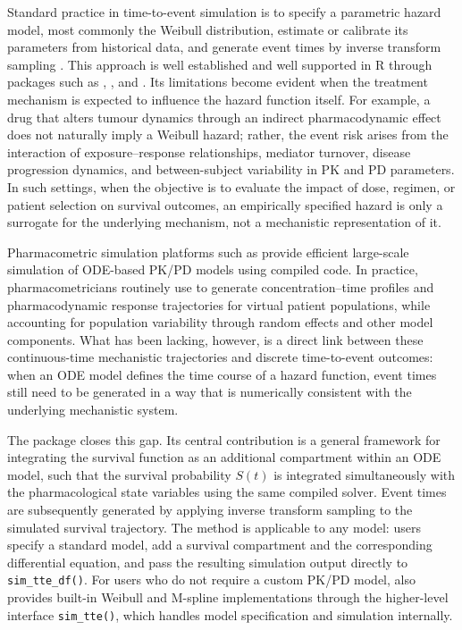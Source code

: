 Standard practice in time-to-event simulation is to specify a parametric hazard model, most commonly the Weibull distribution, estimate or calibrate its parameters from historical data, and generate event times by inverse transform sampling \citep{bender2005}. This approach is well established and well supported in R through packages such as  \citep{simsurv},  \citep{survsim}, and  \citep{simstudy}. Its limitations become evident when the treatment mechanism is expected to influence the hazard function itself. For example, a drug that alters tumour dynamics through an indirect pharmacodynamic effect does not naturally imply a Weibull hazard; rather, the event risk arises from the interaction of exposure--response relationships, mediator turnover, disease progression dynamics, and between-subject variability in PK and PD parameters. In such settings, when the objective is to evaluate the impact of dose, regimen, or patient selection on survival outcomes, an empirically specified hazard is only a surrogate for the underlying mechanism, not a mechanistic representation of it.

Pharmacometric simulation platforms such as  \citep{mrgsolve} provide efficient large-scale simulation of ODE-based PK/PD models using compiled code. In practice, pharmacometricians routinely use  to generate concentration--time profiles and pharmacodynamic response trajectories for virtual patient populations, while accounting for population variability through random effects and other model components. What has been lacking, however, is a direct link between these continuous-time mechanistic trajectories and discrete time-to-event outcomes: when an ODE model defines the time course of a hazard function, event times still need to be generated in a way that is numerically consistent with the underlying mechanistic system.

The  package closes this gap. Its central contribution is a general framework for integrating the survival function as an additional compartment within an  ODE model, such that the survival probability \(S(t)\) is integrated simultaneously with the pharmacological state variables using the same compiled solver. Event times are subsequently generated by applying inverse transform sampling to the simulated survival trajectory. The method is applicable to any  model: users specify a standard  model, add a survival compartment and the corresponding differential equation, and pass the resulting simulation output directly to \texttt{sim\_tte\_df()}. For users who do not require a custom PK/PD model,  also provides built-in Weibull and M-spline implementations through the higher-level interface \texttt{sim\_tte()}, which handles model specification and simulation internally.

